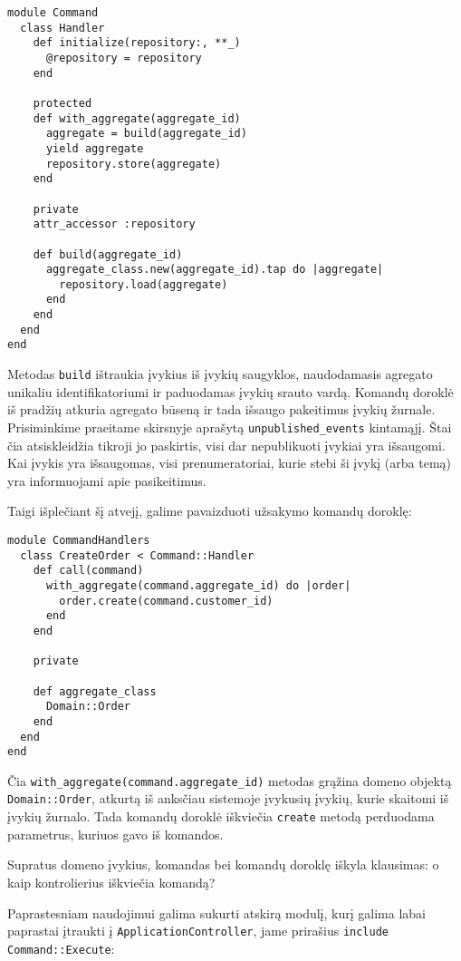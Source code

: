 \begin{lstlisting}
module Command
  class Handler
    def initialize(repository:, **_)
      @repository = repository
    end

    protected
    def with_aggregate(aggregate_id)
      aggregate = build(aggregate_id)
      yield aggregate
      repository.store(aggregate)
    end

    private
    attr_accessor :repository

    def build(aggregate_id)
      aggregate_class.new(aggregate_id).tap do |aggregate|
        repository.load(aggregate)
      end
    end
  end
end
\end{lstlisting}

Metodas \lstinline|build| ištraukia įvykius iš įvykių saugyklos, naudodamasis agregato unikaliu identifikatoriumi ir paduodamas įvykių srauto vardą. Komandų doroklė iš pradžių atkuria agregato būseną ir tada išsaugo pakeitimus įvykių žurnale. Prisiminkime praeitame skirsnyje aprašytą \lstinline|unpublished_events| kintamąjį. Štai čia atsiskleidžia tikroji jo paskirtis, visi dar nepublikuoti įvykiai yra išsaugomi. Kai įvykis yra išsaugomas, visi prenumeratoriai, kurie stebi ši įvykį (arba temą) yra informuojami apie pasikeitimus.

Taigi išplečiant šį atvejį, galime pavaizduoti užsakymo komandų doroklę:

\begin{lstlisting}
module CommandHandlers
  class CreateOrder < Command::Handler
    def call(command)
      with_aggregate(command.aggregate_id) do |order|
        order.create(command.customer_id)
      end
    end

    private

    def aggregate_class
      Domain::Order
    end
  end
end
\end{lstlisting}

Čia \lstinline|with_aggregate(command.aggregate_id)| metodas grąžina domeno objektą \lstinline|Domain::Order|, atkurtą iš anksčiau sistemoje įvykusių įvykių, kurie skaitomi iš įvykių žurnalo. Tada komandų doroklė iškviečia \lstinline|create| metodą perduodama parametrus, kuriuos gavo iš komandos.

Supratus domeno įvykius, komandas bei komandų doroklę iškyla klausimas: o kaip kontrolierius iškviečia komandą?

Paprastesniam naudojimui galima sukurti atskirą modulį, kurį galima labai paprastai įtraukti į \lstinline|ApplicationController|, jame prirašius \lstinline|include Command::Execute|:

